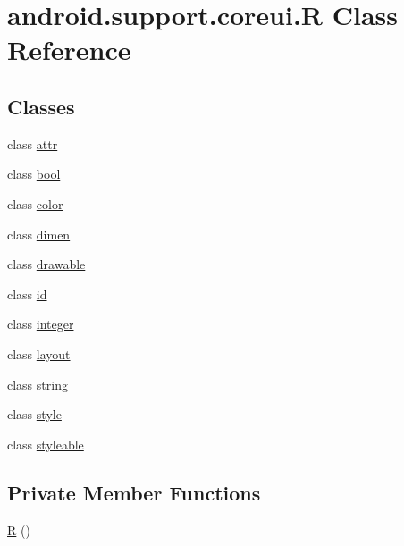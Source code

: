 \hypertarget{classandroid_1_1support_1_1coreui_1_1_r}{}\section{android.\+support.\+coreui.\+R Class Reference}
\label{classandroid_1_1support_1_1coreui_1_1_r}
\subsection*{Classes}
\begin{DoxyCompactItemize}
\item 
class \mbox{\hyperlink{classandroid_1_1support_1_1coreui_1_1_r_1_1attr}{attr}}
\item 
class \mbox{\hyperlink{classandroid_1_1support_1_1coreui_1_1_r_1_1bool}{bool}}
\item 
class \mbox{\hyperlink{classandroid_1_1support_1_1coreui_1_1_r_1_1color}{color}}
\item 
class \mbox{\hyperlink{classandroid_1_1support_1_1coreui_1_1_r_1_1dimen}{dimen}}
\item 
class \mbox{\hyperlink{classandroid_1_1support_1_1coreui_1_1_r_1_1drawable}{drawable}}
\item 
class \mbox{\hyperlink{classandroid_1_1support_1_1coreui_1_1_r_1_1id}{id}}
\item 
class \mbox{\hyperlink{classandroid_1_1support_1_1coreui_1_1_r_1_1integer}{integer}}
\item 
class \mbox{\hyperlink{classandroid_1_1support_1_1coreui_1_1_r_1_1layout}{layout}}
\item 
class \mbox{\hyperlink{classandroid_1_1support_1_1coreui_1_1_r_1_1string}{string}}
\item 
class \mbox{\hyperlink{classandroid_1_1support_1_1coreui_1_1_r_1_1style}{style}}
\item 
class \mbox{\hyperlink{classandroid_1_1support_1_1coreui_1_1_r_1_1styleable}{styleable}}
\end{DoxyCompactItemize}
\subsection*{Private Member Functions}
\begin{DoxyCompactItemize}
\item 
\mbox{\hyperlink{classandroid_1_1support_1_1coreui_1_1_r_a3da75b0c0738bf933a54234a5d209dbd}{R}} ()
\end{DoxyCompactItemize}


